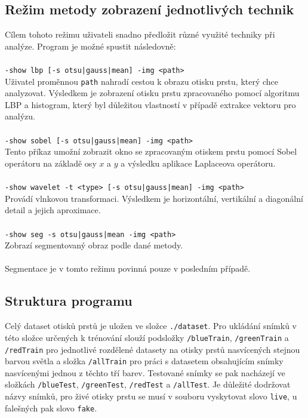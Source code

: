 \subsection{Režim metody zobrazení jednotlivých technik}
Cílem tohoto režimu uživateli snadno předložit různé využité techniky při analýze. Program je možné spustit následovně:\\\\
\verb=-show lbp [-s otsu|gauss|mean] -img <path>=\\
Uživatel proměnnou \verb=path= nahradí cestou k obrazu otisku prstu, který chce analyzovat. Výsledkem je zobrazení otisku prstu zpracovaného pomocí algoritmu LBP a histogram, který byl důležitou vlastností v případě extrakce vektoru pro analýzu.\\\\
\verb=-show sobel [-s otsu|gauss|mean] -img <path>=\\
Tento příkaz umožní zobrazit okno se zpracovaným otiskem prstu pomocí Sobel operátoru na základě osy $x$ a $y$ a výsledku aplikace Laplaceova operátoru.\\\\
\verb=-show wavelet -t <type> [-s otsu|gauss|mean] -img <path>=\\
Provádí vlnkovou transformaci. Výsledkem je horizontální, vertikální a diagonální detail a jejich aproximace.\\\\
\verb=-show seg -s otsu|gauss|mean -img <path>=\\
Zobrazí segmentovaný obraz podle dané metody.\\\\
Segmentace je v tomto režimu povinná pouze v posledním případě.

\subsection{Struktura programu}
Celý dataset otisků prstů je uložen ve složce \verb=./dataset=. Pro ukládání snímků v této složce určených k trénování slouží podsložky \verb=/blueTrain=, \verb=/greenTrain= a \verb=/redTrain= pro jednotlivé rozdělené datasety na otisky prstů nasvícených stejnou barvou světla a složka \verb=/allTrain= pro práci s datasetem obsahujícím snímky nasvícenými jednou z těchto tří barev. Testované snímky se pak nacházejí ve složkách \verb=/blueTest=, \verb=/greenTest=, \verb=/redTest= a \verb=/allTest=. Je důležité dodržovat názvy snímků, pro živé otisky prstu se musí v souboru vyskytovat slovo \verb=live=, u falešných pak slovo \verb=fake=. 


